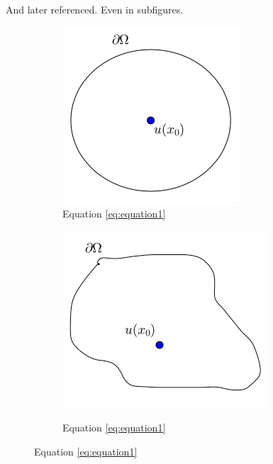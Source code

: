And later referenced. Even in subfigures.
\begin{figure}[!htb]
    \centering
    \begin{subfigure}[b]{0.3\textwidth}
        \centering
        \includegraphics[width=\textwidth]{images/CircCenter}
        \caption{Equation \ref{eq:equation1}}\label{fig:circcenter}
    \end{subfigure}
    \hfill
    \begin{subfigure}[b]{0.3\textwidth}
        \centering
        \includegraphics[width=\textwidth]{images/GeneralOffset}
        \label{fig:generaloffset}
        \caption{Equation \ref{eq:equation1}}
    \end{subfigure}
\end{figure}
